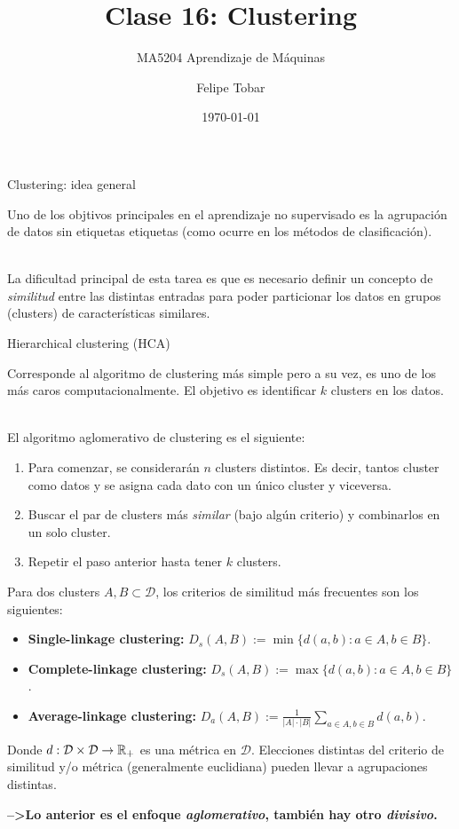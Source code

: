 \documentclass[handout, 9pt]{beamer}
\title{Clase 16: Clustering}
\subtitle{MA5204 Aprendizaje de Máquinas}
\date{\today}
\author{Felipe Tobar}
\institute{Iniciativa de Datos e Inteligencia Artificial\\Universidad de Chile}
\begin{document}
\begin{frame}
  \titlepage
\end{frame}

\begin{frame}{Clustering: idea general}
	
	Uno de los objtivos principales en el aprendizaje no supervisado es la agrupación de datos sin  etiquetas etiquetas (como ocurre en los métodos de clasificación).\\~\
	
	\pause
	La dificultad principal de esta tarea es que es necesario definir un concepto de \emph{similitud} 	entre las distintas entradas para poder particionar los datos en grupos (clusters) de características similares.
	
\end{frame}

\begin{frame}{Hierarchical clustering (HCA)}
	
	Corresponde al algoritmo de clustering más simple pero a su vez, es uno de los más caros computacionalmente. El objetivo es identificar $k$ clusters en los datos. \\~\ \pause

 El algoritmo aglomerativo de clustering es el siguiente:

\begin{enumerate}
	\item Para comenzar, se considerarán $n$ clusters distintos. Es decir, tantos cluster como datos y se asigna cada dato con un único cluster y viceversa.\pause
	\item Buscar el par de clusters más \emph{similar} (bajo algún criterio) y combinarlos en un solo cluster.\pause
	\item Repetir el paso anterior hasta tener $k$ clusters.
\end{enumerate}
\pause
Para dos clusters $A,B\subset\mathcal{D}$, los criterios de similitud más frecuentes son los siguientes:

\begin{itemize}
	\item \textbf{Single-linkage clustering:} $D_s(A,B):=\min\{d(a,b):a\in A, b\in B\}$.\pause
	\item \textbf{Complete-linkage clustering:} $D_s(A,B):=\max\{d(a,b):a\in A, b\in B\}$.\pause
	\item \textbf{Average-linkage clustering:} $D_a(A,B):=\frac{1}{|A|\cdot|B|}\sum_{a\in A, b\in B} d(a,b)$.\pause
\end{itemize}

Donde $d:\mathcal{D}\times \mathcal{D}\to \mathbb{R}_+$ es una métrica en $\mathcal{D}$. Elecciones distintas del criterio de similitud y/o métrica (generalmente euclidiana) pueden llevar a agrupaciones distintas.
	
\textbf{-->Lo anterior es el enfoque \emph{aglomerativo}, también hay otro \emph{divisivo}.}	
\end{frame}
\end{document}
